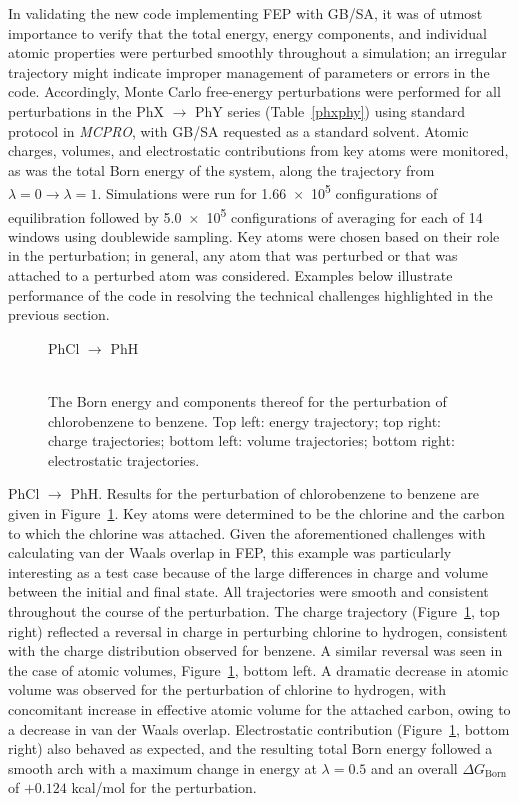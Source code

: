 \documentclass[12pt]{report}
\def\tablab{Table}\def\tabslab{\tablab s}
\def\figlab{Figure}\def\figslab{\figlab s}
\newcommand*\tbl[1]{\tablab~\ref{#1}}
\newcommand*\fig[1]{\figlab~\ref{#1}}
\begin{document}
In validating the new code implementing FEP with GB/SA, it was of utmost importance to verify that the total energy, energy components, and individual atomic properties were perturbed smoothly throughout a simulation; an irregular trajectory might indicate improper management of parameters or errors in the code. Accordingly, Monte Carlo free-energy perturbations were performed for all perturbations in the PhX $\longrightarrow$ PhY series (\tbl{phxphy}) using standard protocol in \textit{MCPRO}, with GB/SA requested as a standard solvent. Atomic charges, volumes, and electrostatic contributions from key atoms were monitored, as was the total Born energy of the system, along the trajectory from $\lambda = 0 \longrightarrow \lambda = 1$. Simulations were run for \num{1.66e5} configurations of equilibration followed by \num{5.0e5} configurations of averaging for each of 14 windows using doublewide sampling. Key atoms were chosen based on their role in the perturbation; in general, any atom that was perturbed or that was attached to a perturbed atom was considered. Examples below illustrate performance of the code in resolving the technical challenges highlighted in the previous section.

\begin{figure}[b!]
\centering
PhCl $\longrightarrow$ PhH\\
\hspace*{-1.3cm}\\
\hspace*{-1.3cm}
\caption{The Born energy and components thereof for the perturbation of chlorobenzene to benzene. Top left: energy trajectory; top right: charge trajectories; bottom left: volume trajectories; bottom right: electrostatic trajectories.}
\label{clh}
\end{figure}

PhCl $\longrightarrow$ PhH. Results for the perturbation of chlorobenzene to benzene are given in \fig{clh}. Key atoms were determined to be the chlorine and the carbon to which the chlorine was attached. Given the aforementioned challenges with calculating van der Waals overlap in FEP, this example was particularly interesting as a test case because of the large differences in charge and volume between the initial and final state. All trajectories were smooth and consistent throughout the course of the perturbation. The charge trajectory (\fig{clh}, top right) reflected a reversal in charge in perturbing chlorine to hydrogen, consistent with the charge distribution observed for benzene. A similar reversal was seen in the case of atomic volumes, \fig{clh}, bottom left. A dramatic decrease in atomic volume was observed for the perturbation of chlorine to hydrogen, with concomitant increase in effective atomic volume for the attached carbon, owing to a decrease in van der Waals overlap. Electrostatic contribution (\fig{clh}, bottom right) also behaved as expected, and the resulting total Born energy followed a smooth arch with a maximum change in energy at $\lambda = 0.5$ and an overall $\Delta G_{ \textrm{Born}}$ of $+0.124$ kcal/mol for the perturbation.
\end{document}
